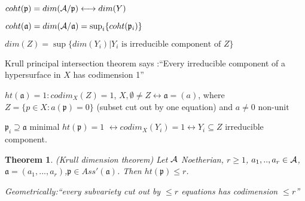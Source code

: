 \documentclass[11pt]{article}
\newtheorem{thm}{Theorem}[section]
\newcommand{\sca}{{\mathfrak a}}
\newcommand{\scp}{{\mathfrak p}}
\newcommand{\cala}{{\cal A}}
\newcommand{\llrta}{\longleftrightarrow}
\begin{document}
$coht(\scp)=dim(\cala/\scp)\llrta dim(Y)$

$coht(\sca)=dim(\cala/\sca)=\sup_i \{coht(\scp_i)\}$

$dim(Z)=\sup\{ dim(Y_i)| Y_i\text{ is irreducible component of $Z$}\}$

Krull principal intersection theorem says :``Every irreducible component of a hypersurface in $X$ has codimension 1''

$ht(\sca)=1:codim_X(Z)=1$, $X,\emptyset\neq Z\llrta\sca=(a)$, where $Z=\{p\in X:a(\scp)=0\}$ (subset cut out by one equation) and $a\neq 0\text{ non-unit}$

$\scp_i\supseteq \sca$ minimal $ht(\scp)=1$ $\llrta codim_X(Y_i)=1\llrta Y_i\subseteq Z$ irreducible component.

\begin{thm}\label{thm:Krull_dimension}
(Krull dimension theorem)
Let $\cala$ Noetherian, $r\geq 1$, $a_1,..,a_r\in\cala$, $\sca=(a_1,...,a_r)$,$\scp\in Ass'(\sca)$. Then $ht(\scp)\leq r$.

Geometrically:``every subvariety cut out by $\leq r$ equations has codimension $\leq r$''

\end{thm}
\end{document}
